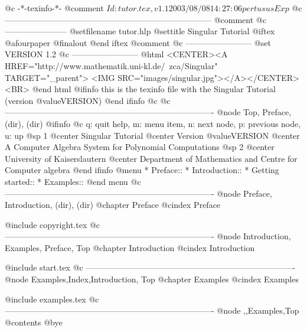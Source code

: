     @c -*-texinfo-*-
@comment $Id: tutor.tex,v 1.1 2003/08/08 14:27:06 pertusus Exp $
@c ---------------------------------------------------------------------------
@comment %
@c -----------------------
@setfilename tutor.hlp
@settitle Singular Tutorial
@iftex
@afourpaper
@finalout
@end iftex
@comment %
@c ------------------------
@set VERSION 1.2
@c ------------------------
@html
<CENTER><A HREF="http://www.mathematik.uni-kl.de/~zca/Singular" TARGET="_parent">
<IMG SRC="images/singular.jpg"></A></CENTER><BR>
@end html
@ifinfo
this is the texinfo file with the Singular Tutorial (version @value{VERSION})
@end ifinfo
@c
@c ----------------------------------------------------------------------------
@node    Top, Preface,    (dir),    (dir)
@ifinfo
@c q: quit help, m: menu item, n: next node, p: previous node, u: up
@sp 1
@center Singular Tutorial
@center Version @value{VERSION}
@center A Computer Algebra System for Polynomial Computations
@sp 2
@center University of Kaiserslautern
@center Department of Mathematics and Centre for Computer algebra
@end ifinfo
@menu
* Preface::
* Introduction::
* Getting started::
* Examples::
@end menu
@c ----------------------------------------------------------------------------
@node Preface, Introduction, (dir),  (dir)
@chapter Preface
@cindex Preface

@include copyright.tex
@c ----------------------------------------------------------------------------
@node Introduction, Examples, Preface, Top
@chapter Introduction
@cindex Introduction

@include start.tex
@c ----------------------------------------------------------------------------
@node Examples,Index,Introduction, Top
@chapter Examples
@cindex Examples

@include examples.tex
@c ----------------------------------------------------------------------------
@node ,,Examples,Top
@contents
@bye
